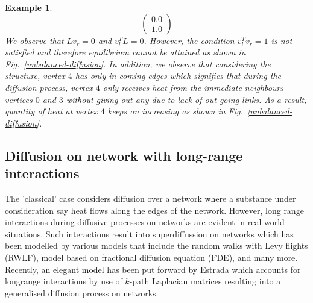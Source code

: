 \documentclass[10pt,a4paper]{article}
\newtheorem{exa}{Example}
\begin{document}
\begin{exa}
\begin{equation*}
\begin{pmatrix}
   0.0 \\
   1.0
   \end{pmatrix}
   \end{equation*}
   We observe that $Lv_r = 0$ and $v_l^TL = 0$. However, the condition $v_l^T v_r = 1$  is not satisfied and therefore equilibrium cannot be attained as shown in Fig.~\ref{unbalanced-diffusion}. In addition, we observe that considering the structure, vertex $4$ has only in coming edges which signifies that during the diffusion process, vertex $4$ only receives heat from the immediate neighbours vertices $0$ and $3$ without giving out any due to lack of out going links. As a result, quantity of heat at vertex $4$ keeps on increasing as shown in Fig.~\ref{unbalanced-diffusion}.
   \end{exa}	
    \subsection{Diffusion on network with long-range interactions}
    	    The 'classical' case considers diffusion over a network where a substance under consideration say heat flows along the edges of the network. However, long range interactions during diffusive processes on networks are evident in real world situations. Such interactions result into superdiffussion on networks which has been modelled by various models that include the random walks with Levy flights (RWLF), model based on fractional diffusion equation (FDE), and many more. Recently, an elegant model has been put forward by Estrada \citep{estrada2017path} which accounts for longrange interactions by use of $k$-path Laplacian matrices resulting into a generalised diffusion process on networks.
    	    
    	    
\end{document}
